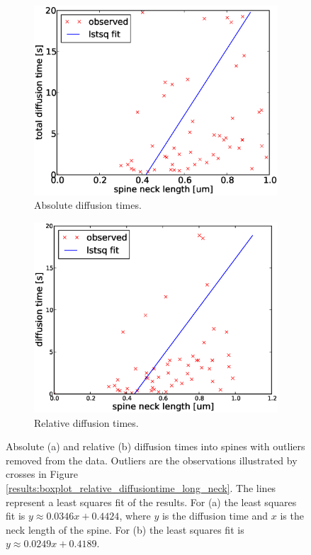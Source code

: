 \begin{figure}[h]
 \centering
\begin{subfigure}[b]{0.48\textwidth}
 \includegraphics[width=\textwidth]{Figures/spine_stats_fulltime_nl.eps}
 \caption{Absolute diffusion times.}
 \label{results:spine_diffusion_stats:fulltime}
 \end{subfigure}
 \begin{subfigure}[b]{0.48\textwidth}
 \includegraphics[width=\textwidth]{Figures/spine_stats_reltime_nl.eps}
 \caption{Relative diffusion times.}
 \label{results:spine_diffusion_stats:reltime}
\end{subfigure}
\caption[Diffusion times with least squares fit]{Absolute (a) and relative (b) diffusion times into spines with outliers removed from the data. Outliers are the observations illustrated by crosses in Figure \ref{results:boxplot_relative_diffusiontime_long_neck}. The lines represent a least squares fit of the results. For (a) the least squares fit is $y\approx 0.0346x +0.4424$, where $y$ is the diffusion time and $x$ is the neck length of the spine. For (b) the least squares fit is $y\approx 0.0249x+ 0.4189$. }
\label{results:spine_diffusion_stats}
\end{figure}


